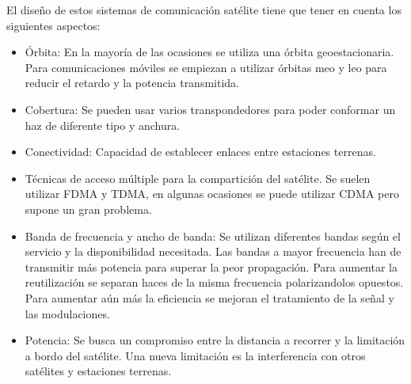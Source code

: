 		El diseño de estos sistemas de comunicación satélite tiene que tener en cuenta los siguientes aspectos:
		\begin{itemize}
			\item Órbita: En la mayoría de las ocasiones se utiliza una órbita geoestacionaria. Para comunicaciones móviles se empiezan a utilizar órbitas meo y leo para reducir el retardo y la potencia transmitida.
			\item Cobertura: Se pueden usar varios transpondedores para poder conformar un haz de diferente tipo y anchura.
			\item Conectividad: Capacidad de establecer enlaces entre estaciones terrenas. 
			\item Técnicas de acceso múltiple para la compartición del satélite. Se suelen utilizar FDMA y TDMA, en algunas ocasiones se puede utilizar CDMA pero supone un gran problema.
			\item Banda de frecuencia y ancho de banda: Se utilizan diferentes bandas según el servicio y la disponibilidad necesitada. Las bandas a mayor frecuencia han de transmitir más potencia para superar la peor propagación. Para aumentar la reutilización se separan haces de la misma frecuencia polarizandolos opuestos. Para aumentar aún más la eficiencia se mejoran el tratamiento de la señal y las modulaciones.
			\item Potencia: Se busca un compromiso entre la distancia a recorrer y la limitación a bordo del satélite. Una nueva limitación es la interferencia con otros satélites y estaciones terrenas.
		\end{itemize}
